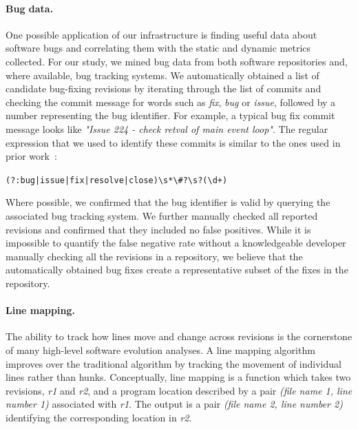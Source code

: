 
\paragraph{Bug data.} One possible application of our infrastructure is finding
useful data about software bugs and correlating them with the static and
dynamic metrics collected. For our study, we mined bug data from both software
repositories and, where available, bug tracking systems.  We automatically
obtained a list of candidate bug-fixing revisions by iterating through the list
of commits and checking the commit message for words such as {\em fix}, {\em
bug} or {\em issue}, followed by a number representing the bug identifier.  For
example, a typical \memcached bug fix commit message looks like {\em "Issue 224
- check retval of main event loop"}. The regular expression that we used to
identify these commits is similar to the ones used in prior
work~\cite{genealogies:issre13}:

\lstinline`(?:bug|issue|fix|resolve|close)\s*\#?\s?(\d+)`

Where possible, we confirmed that the bug identifier is valid by querying the
associated bug tracking system. We further manually checked all reported
revisions and confirmed that they included no false positives.  While it is
impossible to quantify the false negative rate without a knowledgeable
developer manually checking all the revisions in a repository, we believe that
the automatically obtained bug fixes create a representative subset of the
fixes in the repository.

\paragraph{Line mapping.} The ability to track how lines move and change
across revisions is the cornerstone of many high-level software
evolution analyses.  A line mapping algorithm improves over the
traditional \diff algorithm by tracking the movement of individual
lines rather than hunks.  Conceptually, line mapping is a function
which takes two revisions, \textit{r1} and \textit{r2}, and a program
location described by a pair \textit{(file name 1, line number 1)}
associated with \textit{r1}.  The output is a pair \textit{(file name
  2, line number 2)} identifying the corresponding location in
\textit{r2}.

